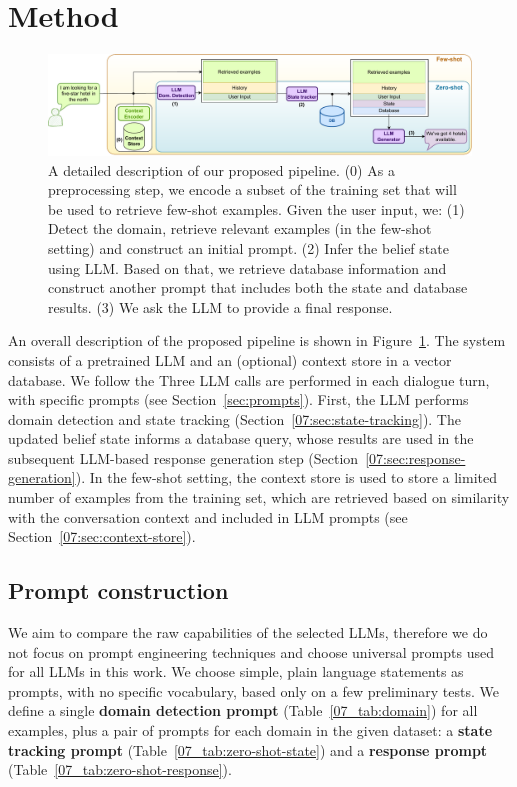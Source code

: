 \section{Method}
\label{07:sec:method}
\begin{figure}[t]
    \centering
    \includegraphics[width=\textwidth]{images/llm-chatbot-v3.pdf}
    \caption{A detailed description of our proposed pipeline. (0) As a preprocessing step, we encode a subset of the training set that will be used to retrieve few-shot examples.
    Given the user input, we: (1) Detect the domain, retrieve relevant examples (in the few-shot setting) and construct an initial prompt. (2) Infer the belief state using LLM. Based on that, we retrieve database information and construct another prompt that includes both the state and database results. (3) We ask the LLM to provide a final response.}
    \label{07:fig:overview_low_level}
\end{figure}
An overall description of the proposed pipeline is shown in Figure~\ref{07:fig:overview_low_level}.
The system consists of a pretrained LLM and an (optional) context store in a vector database.
We follow the 
Three LLM calls are performed in each dialogue turn, with specific prompts (see Section~\ref{sec:prompts}).
First, the LLM performs domain detection and state tracking (Section~\ref{07:sec:state-tracking}). The updated belief state informs a database query, whose results are used in the subsequent LLM-based response generation step (Section~\ref{07:sec:response-generation}).
In the few-shot setting, the context store is used to store a limited number of examples from the training set, which are retrieved based on similarity with the conversation context and included in LLM prompts (see Section~\ref{07:sec:context-store}).



\subsection{Prompt construction}
\label{07:sec:prompts}
We aim to compare the raw capabilities of the selected LLMs, therefore we do not focus on prompt engineering techniques and choose universal prompts used for all LLMs in this work.
We choose simple, plain language statements as prompts, with no specific vocabulary, based only on a few preliminary tests.
We define a single \textbf{domain detection prompt} (Table~\ref{07_tab:domain}) for all examples, plus a pair of prompts for each domain in the given dataset: a \textbf{state tracking prompt} (Table~\ref{07_tab:zero-shot-state}) and a \textbf{response prompt} (Table~\ref{07_tab:zero-shot-response}).

